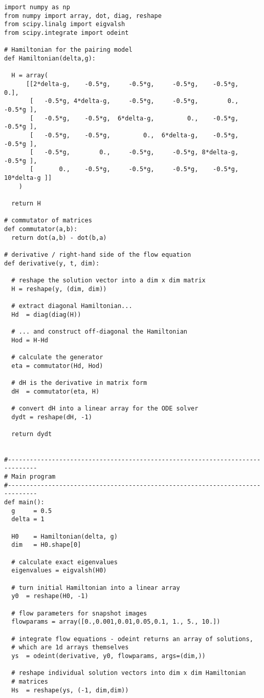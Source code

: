 \begin{lstlisting}
import numpy as np
from numpy import array, dot, diag, reshape
from scipy.linalg import eigvalsh
from scipy.integrate import odeint

# Hamiltonian for the pairing model
def Hamiltonian(delta,g):

  H = array(
      [[2*delta-g,    -0.5*g,     -0.5*g,     -0.5*g,    -0.5*g,          0.],
       [   -0.5*g, 4*delta-g,     -0.5*g,     -0.5*g,        0.,     -0.5*g ], 
       [   -0.5*g,    -0.5*g,  6*delta-g,         0.,    -0.5*g,     -0.5*g ], 
       [   -0.5*g,    -0.5*g,         0.,  6*delta-g,    -0.5*g,     -0.5*g ], 
       [   -0.5*g,        0.,     -0.5*g,     -0.5*g, 8*delta-g,     -0.5*g ], 
       [       0.,    -0.5*g,     -0.5*g,     -0.5*g,    -0.5*g, 10*delta-g ]]
    )

  return H

# commutator of matrices
def commutator(a,b):
  return dot(a,b) - dot(b,a)

# derivative / right-hand side of the flow equation
def derivative(y, t, dim):

  # reshape the solution vector into a dim x dim matrix
  H = reshape(y, (dim, dim))

  # extract diagonal Hamiltonian...
  Hd  = diag(diag(H))

  # ... and construct off-diagonal the Hamiltonian
  Hod = H-Hd

  # calculate the generator
  eta = commutator(Hd, Hod)

  # dH is the derivative in matrix form 
  dH  = commutator(eta, H)

  # convert dH into a linear array for the ODE solver
  dydt = reshape(dH, -1)
    
  return dydt


#------------------------------------------------------------------------------
# Main program
#------------------------------------------------------------------------------
def main():
  g     = 0.5
  delta = 1

  H0    = Hamiltonian(delta, g)
  dim   = H0.shape[0]

  # calculate exact eigenvalues
  eigenvalues = eigvalsh(H0)

  # turn initial Hamiltonian into a linear array
  y0  = reshape(H0, -1)                 

  # flow parameters for snapshot images
  flowparams = array([0.,0.001,0.01,0.05,0.1, 1., 5., 10.])

  # integrate flow equations - odeint returns an array of solutions,
  # which are 1d arrays themselves
  ys  = odeint(derivative, y0, flowparams, args=(dim,))

  # reshape individual solution vectors into dim x dim Hamiltonian
  # matrices
  Hs  = reshape(ys, (-1, dim,dim))
\end{lstlisting}


